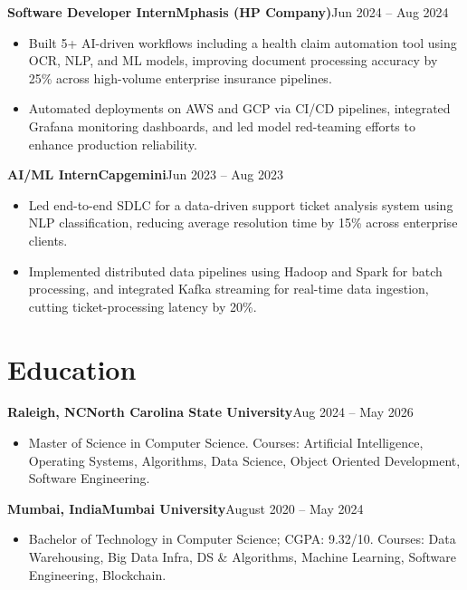 \documentclass[9pt,letterpaper]{extarticle}
\newcommand{\entry}[3]{%
  \noindent\textbf{#1}\hfill\textbf{#2}\hfill #3%
}
\begin{document}
\vspace{2pt}
\entry{Software Developer Intern}{Mphasis (HP Company)}{Jun 2024 -- Aug 2024}
\begin{itemize}
\item Built 5+ AI-driven workflows including a health claim automation tool using OCR, NLP, and ML models, improving document processing accuracy by 25\% across high-volume enterprise insurance pipelines.
\item Automated deployments on AWS and GCP via CI/CD pipelines, integrated Grafana monitoring dashboards, and led model red-teaming efforts to enhance production reliability.
\end{itemize}

\vspace{2pt}
\entry{AI/ML Intern}{Capgemini}{Jun 2023 -- Aug 2023}
\begin{itemize}
\item Led end-to-end SDLC for a data-driven support ticket analysis system using NLP classification, reducing average resolution time by 15\% across enterprise clients.
\item Implemented distributed data pipelines using Hadoop and Spark for batch processing, and integrated Kafka streaming for real-time data ingestion, cutting ticket-processing latency by 20\%.
\end{itemize}

\section{Education}

\entry{Raleigh, NC}{North Carolina State University}{Aug 2024 -- May 2026}
\begin{itemize}
\item Master of Science in Computer Science. Courses: Artificial Intelligence, Operating Systems, Algorithms, Data Science, Object Oriented Development, Software Engineering.
\end{itemize}

\vspace{2pt}
\entry{Mumbai, India}{Mumbai University}{August 2020 -- May 2024}
\begin{itemize}
\item Bachelor of Technology in Computer Science; CGPA: 9.32/10. Courses: Data Warehousing, Big Data Infra, DS \& Algorithms, Machine Learning, Software Engineering, Blockchain.
\end{itemize}
\end{document}
